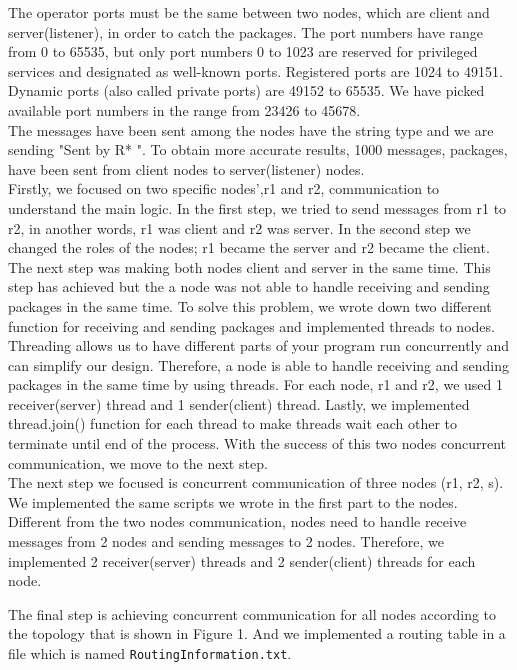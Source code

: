 \documentclass[conference]{IEEEtran}
\begin{document}
The operator ports must be the same between two nodes, which are client and server(listener), in order to catch the packages. The port numbers have range from 0 to 65535, but only port numbers 0 to 1023 are reserved for privileged services and designated as well-known ports. Registered ports are 1024 to 49151. Dynamic ports (also called private ports) are 49152 to 65535. We have picked available port numbers in the range from 23426 to 45678.\\

The messages have been sent among the nodes have the string type and we are sending "Sent by R* ". To obtain more accurate results, 1000 messages, packages, have been sent from client nodes to server(listener) nodes.\\

Firstly, we focused on two specific nodes',r1 and r2, communication to understand the main logic. In the first step, we tried to send messages from r1 to r2, in another words, r1 was client and r2 was server. In the second step we changed the roles of the nodes; r1 became the server and r2 became the client. The next step was making both nodes client and server in the same time. This step has achieved but the a node was not able to handle receiving and sending packages in the same time. To solve this problem, we wrote down two different function for receiving and sending packages and implemented threads to nodes. Threading allows us to have different parts of your program run concurrently and can simplify our design. Therefore, a node is able to handle receiving and sending packages in the same time by using threads. For each node, r1 and r2, we used 1 receiver(server) thread and 1 sender(client) thread. Lastly, we implemented thread.join() function for each thread to make threads wait each other to terminate until end of the process. With the success of this two nodes concurrent communication, we move to the next step. \\

The next step we focused is concurrent communication of three nodes (r1, r2, s). We implemented the same scripts we wrote in the first part to the nodes. Different from the two nodes communication, nodes need to handle receive messages from 2 nodes and sending messages to 2 nodes.  Therefore, we implemented 2 receiver(server) threads and 2 sender(client) threads for each node.

The final step is achieving concurrent communication for all nodes according to the topology that is shown in Figure 1. And we implemented a routing table in a file which is named \verb|RoutingInformation.txt|.
\end{document}
